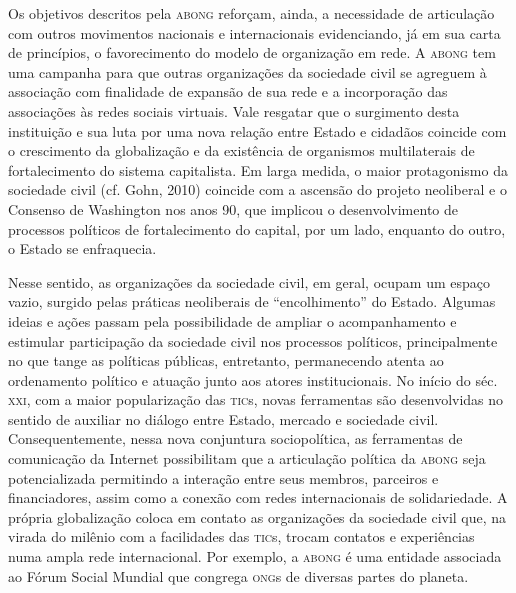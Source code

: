 Os objetivos descritos pela \textsc{abong} reforçam, ainda, a necessidade de
articulação com outros movimentos nacionais e internacionais
evidenciando, já em sua carta de princípios, o favorecimento do modelo
de organização em rede. A \textsc{abong} tem uma campanha para que outras
organizações da sociedade civil se agreguem à associação com finalidade
de expansão de sua rede e a incorporação das associações às redes
sociais virtuais. Vale resgatar que o surgimento desta instituição e sua
luta por uma nova relação entre Estado e cidadãos coincide com o
crescimento da globalização e da existência de organismos multilaterais
de fortalecimento do sistema capitalista. Em larga medida, o maior
protagonismo da sociedade civil (cf. Gohn, 2010) coincide com a ascensão
do projeto neoliberal e o Consenso de Washington nos anos 90, que
implicou o desenvolvimento de processos políticos de fortalecimento do
capital, por um lado, enquanto do outro, o Estado se enfraquecia.

Nesse sentido, as organizações da sociedade civil, em geral, ocupam um
espaço vazio, surgido pelas práticas neoliberais de ``encolhimento'' do
Estado. Algumas ideias e ações passam pela possibilidade de ampliar o
acompanhamento e estimular participação da sociedade civil nos processos
políticos, principalmente no que tange as políticas públicas,
entretanto, permanecendo atenta ao ordenamento político e atuação junto
aos atores institucionais. No início do séc. \textsc{xxi}, com a maior
popularização das \textsc{tic}s, novas ferramentas são desenvolvidas no sentido
de auxiliar no diálogo entre Estado, mercado e sociedade civil.
Consequentemente, nessa nova conjuntura sociopolítica, as ferramentas de
comunicação da Internet possibilitam que a articulação política da \textsc{abong}
seja potencializada permitindo a interação entre seus membros, parceiros
e financiadores, assim como a conexão com redes internacionais de
solidariedade. A própria globalização coloca em contato as organizações
da sociedade civil que, na virada do milênio com a facilidades das \textsc{tic}s,
trocam contatos e experiências numa ampla rede internacional. Por
exemplo, a \textsc{abong} é uma entidade associada ao Fórum Social Mundial que
congrega \textsc{ong}s de diversas partes do planeta.

